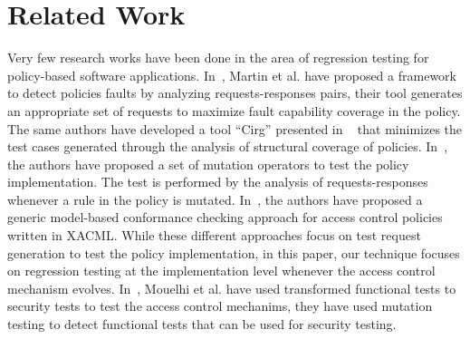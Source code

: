 \section{Related Work}
\label{sec:related}


Very few research works have been done in the area of regression testing for policy-based software applications. 
In~\cite{martin06:defining}, Martin et al. have proposed a framework to detect policies faults by analyzing requests-responses pairs, their tool 
generates an appropriate set of requests to maximize fault capability coverage in the policy. The same authors have developed a tool ``Cirg'' presented in 
~\cite{martin07:automated} that minimizes the test cases generated through the analysis of structural coverage of policies. 
In~\cite{martin07:fault}, the authors have proposed a set of mutation operators to test the policy implementation. The test is performed by the analysis 
of requests-responses whenever a rule in the policy is mutated.
In~\cite{hu07:conformance}, the authors have proposed a generic model-based conformance checking approach for access control policies written in
XACML. While these different approaches focus on test request generation to test the policy implementation, in this paper, our technique focuses on 
regression testing at the implementation level whenever the access control mechanism evolves. 
In~\cite{mouelhi09:tranforming}, Mouelhi et al. have used transformed functional tests to security tests to test the access control mechanims, 
they have used mutation testing to detect functional tests that can be used for security testing.


